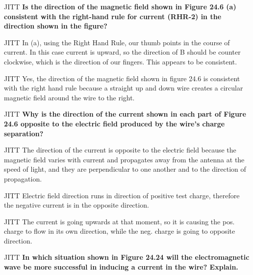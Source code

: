 \documentclass{beamer}
\begin{document}
\begin{frame}{JITT}
\textbf{Is the direction of the magnetic field shown in Figure 24.6 (a) consistent with the right-hand rule for current (RHR-2) in the
direction shown in the figure?}
\end{frame}

\begin{frame}{JITT}
In (a), using the Right Hand Rule, our thumb points in the course of current. In this case current is upward, so the direction of B should be counter clockwise, which is the direction of our fingers. This appears to be consistent. 
\end{frame}

\begin{frame}{JITT}
Yes, the direction of the magnetic field shown in figure 24.6 is consistent with the right hand rule because a straight up and down wire creates a circular magnetic field around the wire to the right. 
\end{frame}

\begin{frame}{JITT}
\textbf{Why is the direction of the current shown in each part of Figure 24.6 opposite to the electric field produced by the wire’s
charge separation?}
\end{frame}

\begin{frame}{JITT}
The direction of the current is opposite to the electric field because the magnetic field varies with current and propagates away from the antenna at the speed of light, and they are perpendicular to one another and to the direction of propagation.
\end{frame}

\begin{frame}{JITT}
Electric field direction runs in direction of positive test charge, therefore the negative current is in the opposite direction.
\end{frame}

\begin{frame}{JITT}
The current is going upwards at that moment, so it is causing the pos. charge to flow in its own direction, while the neg. charge is going to opposite direction.
\end{frame}

\begin{frame}{JITT}
\textbf{In which situation shown in Figure 24.24 will the electromagnetic wave be more successful in inducing a current in the wire? Explain.}
\end{frame}
\end{document}

